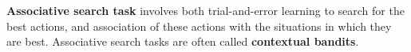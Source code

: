 \textbf{Associative search task} involves both trial-and-error learning to search for the best actions, and association of these actions with the situations in which they are best. Associative search tasks are often called \textbf{contextual bandits}.









































































